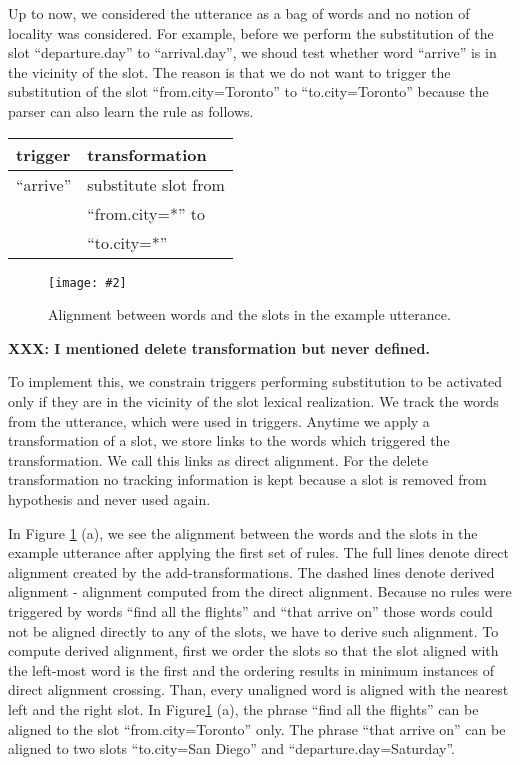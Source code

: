 \documentclass[11pt]{article}
\newcommand{\fgrparam}[4]{
  \begin{figure}[htbp]
    \begin{center}
      \leavevmode
      \texttt{[image: \#2]}
    \end{center}
    \caption{#4}
    \label{#3}
  \end{figure}
}
\begin{document}
Up to now, we considered the utterance as a bag of words and no notion of locality was considered. For example, before we perform the substitution of the slot ``departure.day'' to ``arrival.day'', we shoud test whether word ``arrive'' is in the vicinity of the slot. The reason is that we do not want to trigger the substitution of the slot ``from.city=Toronto'' to ``to.city=Toronto'' because the parser can also learn the rule as follows. 

\vspace{.25cm}
\begin{tabular}{ll}
  trigger & transformation \\
  \hline 
  ``arrive''            & substitute slot from\\
                        & ``from.city=*'' to \\
                        & ``to.city=*'' \\
\end{tabular} 
\vspace{.25cm}
\fgrparam{width=8cm}{./fig/words-slots-alignment.pdf}{fig:alignment}{Alignment between words and the slots in the example utterance.}

\textbf{XXX: I mentioned delete transformation but never defined.}

To implement this, we constrain triggers performing substitution to be activated only if they are in the vicinity of the slot lexical realization.  We track the words from the utterance, which were used in triggers. Anytime we apply a transformation of a slot, we store links to the words which triggered the transformation. We call this links as direct alignment. For the delete transformation no tracking information is kept because a slot is removed from hypothesis and never used again.

In Figure \ref{fig:alignment} (a), we see the alignment between the words and the slots in the example utterance after applying the first set of rules. The full lines denote direct alignment created by the add-transformations. The dashed lines denote derived alignment - alignment computed from the direct alignment. Because no rules were triggered by words ``find all the flights'' and ``that arrive on'' those words could not be aligned directly to any of the slots, we have to derive such alignment. To compute derived alignment, first we order the slots so that the slot aligned with the left-most word is the first and the ordering results in minimum instances of direct alignment crossing. Than, every unaligned word is aligned with the nearest left and the right slot. In Figure\ref{fig:alignment} (a), the phrase ``find all the flights'' can be aligned to the slot ``from.city=Toronto'' only. The phrase ``that arrive on'' can be aligned to two slots ``to.city=San Diego'' and ``departure.day=Saturday''.
\end{document}
